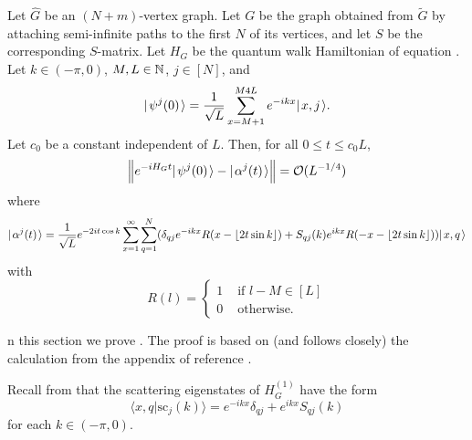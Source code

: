 \documentclass[../thesis-main/thesis-main]{subfiles}
\begin{document}
\begin{theorem} Let $\widehat{G}$ be an $(N+m)$-vertex graph.  Let $G$ be the graph obtained from $\widetilde{G}$ by attaching semi-infinite paths to the first $N$ of its vertices, and let $S$ be the corresponding $S$-matrix.  Let $H_G$ be the quantum walk Hamiltonian of equation . Let $k\in (-\pi,0)$, $M,L\in \mathbb{N}$, $j\in [N]$, and 
\begin{equation}
  |\mspace{2mu} \psi^j(0) \mspace{2mu} \rangle = \frac{1}{\sqrt{L}} \sum_{x=M+1}^{M4L} e^{-i k x} |\mspace{2mu} x,j \mspace{2mu} \rangle.
\end{equation}
Let $c_0$ be a constant independent of $L$.  Then, for all $0 \leq t \leq c_0 L$,
\begin{equation}
   \Big\|e^{-i H_G t}|\mspace{2mu} \psi^j(0) \mspace{2mu} \rangle - |\mspace{2mu} \alpha^j(t) \mspace{2mu} \rangle\Big\| = \mathcal{O}(L^{-1/4})
\end{equation}
where
\begin{equation}
  |\mspace{2mu} \alpha^j(t) \mspace{2mu} \rangle = \frac{1}{\sqrt{L}} e^{-2 i t \cos k} \sum_{x=1}^\infty \sum_{q=1}^N (\delta_{qj} e^{-ikx} R(x- \lfloor 2t \sin k\rfloor ) + S_{qj}(k) e^{ikx} R(-x - \lfloor 2t \sin k\rfloor ) ) |\mspace{2mu} x,q \mspace{2mu} \rangle
\end{equation}
with
\begin{equation}
  R(l) = \begin{cases} 1 & \text{ if } l- M \in [L]\\
    0 & \text{ otherwise.}
    \end{cases}
\end{equation}
\label{thm:SP_wavepacket}
\end{theorem}
n this section we prove . The proof is based on (and follows closely) the calculation from the appendix of reference \cite{FGG08}.

Recall from  that the scattering eigenstates of $H_{G}^{(1)}$ have the
form
\[
\langle x,q|\text{sc}_{j}(k)\rangle=e^{-ikx}\delta_{qj}+e^{ikx}S_{qj}(k)\]
 for each $k\in(-\pi,0)$. 
\end{document}
